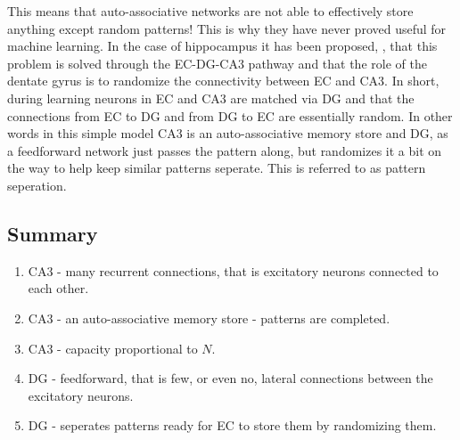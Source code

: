 \documentclass[11pt,a4paper]{scrartcl}
\begin{document}
This means that auto-associative networks are not able to effectively
store anything except random patterns! This is why they have never
proved useful for machine learning. In the case of hippocampus it has
been proposed, \cite{OReillyMcClelland1994a}, that this problem is
solved through the EC-DG-CA3 pathway and that the role of the dentate
gyrus is to randomize the connectivity between EC and CA3. In short,
during learning neurons in EC and CA3 are matched via DG and that the
connections from EC to DG and from DG to EC are essentially random. In
other words in this simple model CA3 is an auto-associative memory
store and DG, as a feedforward network just passes the pattern along,
but randomizes it a bit on the way to help keep similar patterns
seperate. This is referred to as pattern seperation.

\subsection*{Summary}
\begin{enumerate}
\item CA3 - many recurrent connections, that is excitatory neurons connected to each other.
\item CA3 - an auto-associative memory store - patterns are completed.
\item CA3 - capacity proportional to $N$.
\item DG - feedforward, that is few, or even no, lateral connections between the excitatory neurons.
\item DG - seperates patterns ready for EC to store them by randomizing them.
\end{enumerate}
\end{document}
